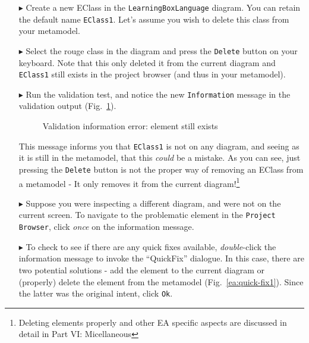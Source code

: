 \begin{enumerate}
\item[$\blacktriangleright$] Create a new EClass in the \texttt{Learning\-Box\-Language} diagram. You can retain the default name \texttt{EClass1}. Let's
assume you wish to delete this class from your metamodel.

\item[$\blacktriangleright$] Select the rouge class in the diagram and press the \texttt{Delete} button on your keyboard. Note that this only deleted it from
the current diagram and \texttt{EClass1} still exists in the project browser (and thus in your metamodel).

\item[$\blacktriangleright$] Run the validation test, and notice the new \texttt{Information} message in the validation output
(Fig.~\ref{ea:validation_information}).

\begin{figure}[htbp]
	\centering
	\caption{Validation information error: element still exists}
	\label{ea:validation_information}
\end{figure}

This message informs you that \texttt{EClass1} is not on any diagram, and seeing as it is still in the metamodel, that this \emph{could} be a mistake. As you
can see, just pressing the \texttt{Delete} button is not the proper way of removing an EClass from a metamodel - It only removes it from the current
diagram!\footnote{Deleting elements properly and other EA specific aspects are discussed in detail in Part VI: Micellaneous}

\item[$\blacktriangleright$] Suppose you were inspecting a different diagram, and were not on the current screen. To navigate to the problematic element in the
\texttt{Project Browser}, click \emph{once} on the information message.

\item[$\blacktriangleright$] To check to see if there are any quick fixes available, \emph{double}-click the information message to invoke the ``QuickFix''
dialogue. In this case, there are two potential solutions - add the element to the current diagram or (properly) delete the element from the metamodel
(Fig.~\ref{ea:quick-fix1}). Since the latter was the original intent, click \texttt{Ok}.

\vspace{0.5cm}


\end{enumerate}
